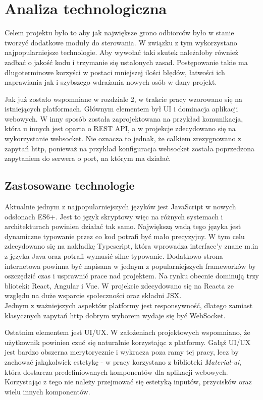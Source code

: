 \chapter{Analiza technologiczna}
Celem projektu było to aby jak największe grono odbiorców było w stanie tworzyć dodatkowe moduły do sterowania. W związku z tym wykorzystano najpopularniejsze technologie. Aby wywołać taki skutek należałoby również zadbać o jakość kodu i trzymanie się ustalonych zasad. Postępowanie takie ma długoterminowe korzyści w postaci mniejszej ilości błędów, łatwości ich naprawiania jak i szybszego wdrażania nowych osób w dany projekt. 
\par Jak już zostało wspomniane w rozdziale 2, w trakcie pracy wzorowano się na istniejących platformach. Głównym elementem był UI i dominacja aplikacji webowych. W inny sposób została zaprojektowana na przykład komunikacja, która u innych jest oparta o REST API, a w projekcje zdecydowano się na wykorzystanie websocket. Nie oznacza to jednak, że całkiem zrezygnowano z zapytań http, ponieważ na przykład konfiguracja websocket została poprzedzona zapytaniem do serwera o port, na którym ma działać.
\section{Zastosowane technologie}
Aktualnie jednym z najpopularniejszych języków jest JavaScript w nowych odsłonach ES6+. Jest to język skryptowy więc na różnych systemach i architekturach powinien działać tak samo. Największą wadą tego języka jest dynamiczne typowanie przez co kod potrafi być mało precyzyjny. W tym celu zdecydowano się na nakładkę Typescript, która wprowadza interface'y znane m.in z języka Java  oraz potrafi wymusić silne typowanie. Dodatkowo strona internetowa powinna być napisana w jednym z popularniejszych frameworków by oszczędzić czas i usprawnić prace nad projektem. Na rynku obecnie dominują trzy blioteki: React, Angular i Vue. W projekcie zdecydowano się na Reacta ze względu na duże wsparcie społeczności oraz składni JSX. \\
Jednym z ważniejszych aspektów platformy jest responsywność, dlatego zamiast klasycznych zapytań http dobrym wyborem wydaje się być WebSocket. \cite{javascript}
\par Ostatnim elementem jest UI/UX. W założeniach projektowych wspomniano, że użytkownik powinien czuć się naturalnie korzystając z platformy. Gałąź UI/UX jest bardzo obszerna merytorycznie i wykracza poza ramy tej pracy, lecz by zachować jakąkolwiek estetykę - w pracy korzystano z biblioteki \textit{Material-ui}, która dostarcza predefiniowanych komponentów dla aplikacji webowych. Korzystając z tego nie należy przejmować się estetyką inputów, przycisków oraz wielu innych komponentów. \cite{materialui}
